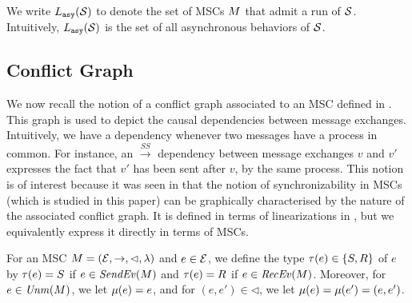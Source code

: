 We write $L_{\mathtt{asy}}(\mathcal{S})$ to denote the set of MSCs $M$ that admit a run of $\mathcal{S}$.
Intuitively, $L_{\mathtt{asy}}(\mathcal{S})$ is the set of all asynchronous behaviors of $\mathcal{S}$.

%

\subsection{Conflict Graph}\label{app:conflict-graph}


We now recall the notion of a conflict graph associated to an MSC defined in \cite{DBLP:conf/cav/BouajjaniEJQ18}. This graph is used to depict the causal dependencies between message exchanges.  Intuitively, we have a dependency whenever
two messages have a process in common. For instance, an $\xrightarrow{SS}$
dependency between message exchanges $v$ and $v'$ expresses the fact that
$v'$ has been sent after $v$, by the same process. This notion is of interest because it was seen in \cite{DBLP:conf/cav/BouajjaniEJQ18} that the notion of synchronizability in MSCs (which is studied in this paper) can be graphically characterised by the nature of the associated conflict graph.
It is defined in terms of linearizations
in \cite{DBLP:conf/fossacs/GiustoLL20}, but we equivalently express it
directly in terms of MSCs.

For an MSC $M = (\mathcal{E}, \rightarrow, \lhd, \lambda)$ and
$e \in \mathcal{E}$, we define the type $\tau(e) \in \{S,R\}$ of $e$ by $\tau(e) = S$ if $e \in \mathit{SendEv}(M)$
and $\tau(e) = R$ if $e \in \mathit{RecEv}(M)$.
Moreover, for $e \in \mathit{Unm}(M)$, we let $\mu(e) = e$,
and for $(e,e') \in \lhd$, we let $\mu(e) = \mu(e') = (e,e')$.



